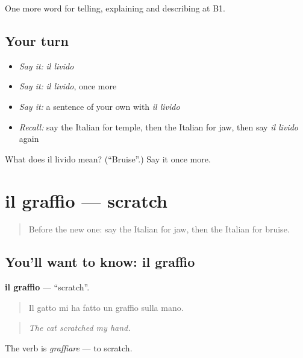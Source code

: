 \begin{grammarlens}[title={What you've built}]
One more word for telling, explaining and describing at B1.
\end{grammarlens}

\subsection*{Your turn}
\begin{itemize}
\raggedright
  \item \emph{Say it:} \emph{il livido}
  \item \emph{Say it:} \emph{il livido}, once more
  \item \emph{Say it:} a sentence of your own with \emph{il livido}
  \item \emph{Recall:} say the Italian for temple, then the Italian for jaw, then say \emph{il livido} again
\end{itemize}

\begin{tcolorbox}[breakable,colback=teal!4,colframe=teal!35!black,title={Before you move on}]
What does il livido mean? (\textquotedblleft{}Bruise\textquotedblright{}.) Say it once more.
\end{tcolorbox}
\section[il graffio]{il graffio — scratch}

\label{lesson:IT-C483-graffio}



\begin{quote}
Before the new one: say the Italian for jaw, then the Italian for bruise.
\end{quote}

\subsection*{You'll want to know: il graffio}
\textbf{il graffio} — \textquotedblleft{}scratch\textquotedblright{}.

\begin{quote}
Il gatto mi ha fatto un graffio sulla mano.
\end{quote}

\begin{quote}
\emph{The cat scratched my hand.}
\end{quote}

The verb is \emph{graffiare} — to scratch.

